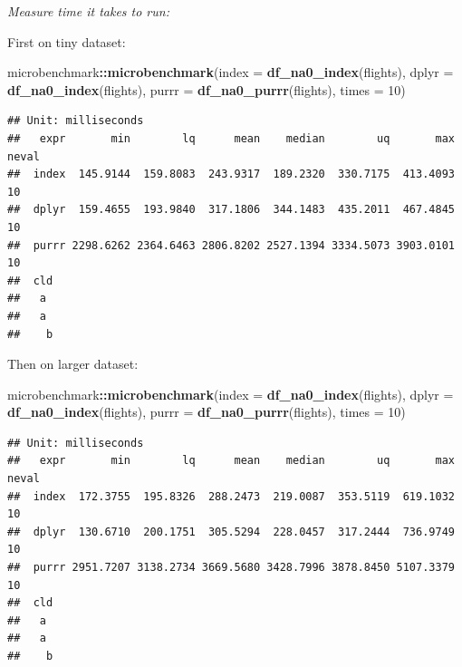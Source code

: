 \documentclass[]{book}
\newenvironment{Shaded}{\begin{snugshade}}{\end{snugshade}}
\newcommand{\DataTypeTok}[1]{\textcolor[rgb]{0.13,0.29,0.53}{#1}}
\newcommand{\DecValTok}[1]{\textcolor[rgb]{0.00,0.00,0.81}{#1}}
\newcommand{\KeywordTok}[1]{\textcolor[rgb]{0.13,0.29,0.53}{\textbf{#1}}}
\newcommand{\NormalTok}[1]{#1}
\newcommand{\OperatorTok}[1]{\textcolor[rgb]{0.81,0.36,0.00}{\textbf{#1}}}
\theoremstyle{definition}
\theoremstyle{definition}
\theoremstyle{definition}
\theoremstyle{remark}
\begin{document}
\emph{Measure time it takes to run: }

First on tiny dataset:

\begin{Shaded}
\begin{Highlighting}[]
\NormalTok{microbenchmark}\OperatorTok{::}\KeywordTok{microbenchmark}\NormalTok{(}\DataTypeTok{index =} \KeywordTok{df_na0_index}\NormalTok{(flights),}
                               \DataTypeTok{dplyr =} \KeywordTok{df_na0_index}\NormalTok{(flights),}
                               \DataTypeTok{purrr =} \KeywordTok{df_na0_purrr}\NormalTok{(flights),}
                               \DataTypeTok{times =} \DecValTok{10}\NormalTok{)}
\end{Highlighting}
\end{Shaded}

\begin{verbatim}
## Unit: milliseconds
##   expr       min        lq      mean    median        uq       max neval
##  index  145.9144  159.8083  243.9317  189.2320  330.7175  413.4093    10
##  dplyr  159.4655  193.9840  317.1806  344.1483  435.2011  467.4845    10
##  purrr 2298.6262 2364.6463 2806.8202 2527.1394 3334.5073 3903.0101    10
##  cld
##   a 
##   a 
##    b
\end{verbatim}

Then on larger dataset:

\begin{Shaded}
\begin{Highlighting}[]
\NormalTok{microbenchmark}\OperatorTok{::}\KeywordTok{microbenchmark}\NormalTok{(}\DataTypeTok{index =} \KeywordTok{df_na0_index}\NormalTok{(flights),}
                               \DataTypeTok{dplyr =} \KeywordTok{df_na0_index}\NormalTok{(flights),}
                               \DataTypeTok{purrr =} \KeywordTok{df_na0_purrr}\NormalTok{(flights),}
                               \DataTypeTok{times =} \DecValTok{10}\NormalTok{)}
\end{Highlighting}
\end{Shaded}

\begin{verbatim}
## Unit: milliseconds
##   expr       min        lq      mean    median        uq       max neval
##  index  172.3755  195.8326  288.2473  219.0087  353.5119  619.1032    10
##  dplyr  130.6710  200.1751  305.5294  228.0457  317.2444  736.9749    10
##  purrr 2951.7207 3138.2734 3669.5680 3428.7996 3878.8450 5107.3379    10
##  cld
##   a 
##   a 
##    b
\end{verbatim}
\end{document}

